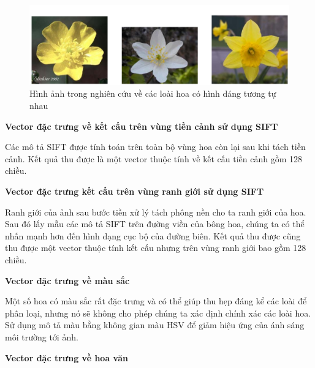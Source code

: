\documentclass[12pt]{report}
\begin{document}
		\begin{figure}[h]
			\centering
			\includegraphics[scale=0.4]{anh_hoa_hinh_dang}
			\caption{Hình ảnh trong nghiên cứu \cite{cia-Nilsback06} về các loài hoa có hình dáng tương tự nhau}
			\label{fig:anh_hoa_hinh_dang}
		\end{figure}						 
																																														 
																																											
		\textbf{Vector đặc trưng về kết cấu trên vùng tiền cảnh sử dụng SIFT \cite{cia_SIFT}}	
																																		
		Các mô tả SIFT \cite{cia_SIFT} được tính toán trên toàn bộ vùng hoa còn lại sau khi tách tiền cảnh. Kết quả thu được là một vector thuộc tính về kết cấu tiền cảnh gồm 128 chiều.						 
																																		
																																										 
		\textbf{Vector đặc trưng kết cấu trên vùng ranh giới sử dụng SIFT \cite{cia_SIFT}}												
																																		
		Ranh giới của ảnh sau bước tiền xử lý tách phông nền cho ta ranh giới của hoa. Sau đó lấy mẫu các mô tả SIFT \cite{cia_SIFT} trên đường viền của bông hoa, chúng ta có thể nhấn mạnh hơn đến hình dạng cục bộ của đường biên. Kết quả thu được cũng thu được một vector thuộc tính kết cấu nhưng trên vùng ranh giới bao gồm 128 chiều.							
																																												
																																		
		\textbf{Vector đặc trưng về màu sắc}
																																
		Một số hoa có màu sắc rất đặc trưng và có thể giúp thu hẹp đáng kể các loài để phân loại, nhưng nó sẽ không cho phép chúng ta xác định chính xác các loài hoa. Sử dụng mô tả màu bằng không gian màu HSV \cite{cia-Nilsback06} để giảm hiệu ứng của ánh sáng môi trường tới ảnh.
																														
		\textbf{Vector đặc trưng về hoa văn}
		
\end{document}
